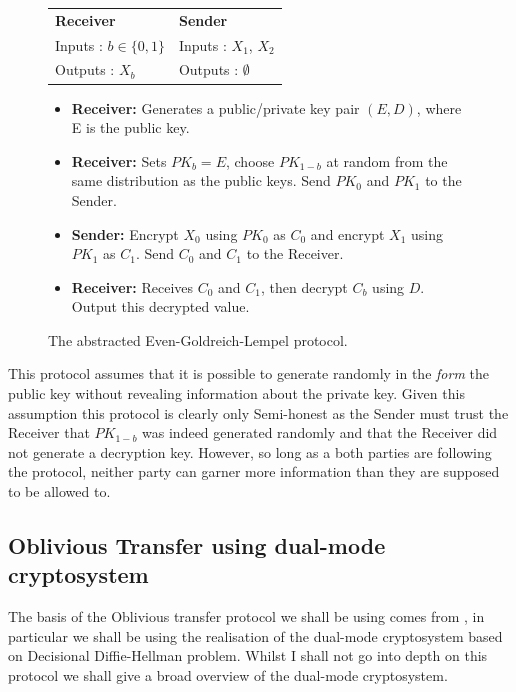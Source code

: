 \documentclass[a4paper,10pt]{article}
\begin{document}
				\begin{figure}
					\begin{tabular}[!htb]{p{6cm} p{6cm}}
						\textbf{Receiver} & \textbf{Sender}\\
						Inputs : $b \in \{0, 1\}$ & Inputs : $X_1$, $X_2$\\
						Outputs : $X_b$ & Outputs : $\emptyset$\\
					\end{tabular}

					\begin{itemize}
						\setlength{\itemsep}{0.5pt}
						\setlength{\parskip}{0pt}
						\setlength{\parsep}{0pt}

						\item \textbf{Receiver:} Generates a public/private key pair $(E, D)$, where E is the public key.\\
						\item \textbf{Receiver:} Sets $PK_b = E$, choose $PK_{1-b}$ at random from the same distribution as the public keys. Send $PK_0$ and $PK_1$ to the Sender.\\
						\item \textbf{Sender:} Encrypt $X_0$ using $PK_0$ as $C_0$ and encrypt $X_1$ using $PK_1$ as $C_1$. Send $C_0$ and $C_1$ to the Receiver.\\
						\item \textbf{Receiver:} Receives $C_0$ and $C_1$, then decrypt $C_b$ using $D$. Output this decrypted value.
					\end{itemize}

					\caption{The abstracted Even-Goldreich-Lempel protocol.}
				\end{figure}

				This protocol assumes that it is possible to generate randomly in the \emph{form} the public key without revealing information about the private key. Given this assumption this protocol is clearly only Semi-honest as the Sender must trust the Receiver that $PK_{1-b}$ was indeed generated randomly and that the Receiver did not generate a decryption key. However, so long as a both parties are following the protocol, neither party can garner more information than they are supposed to be allowed to.
 
		\subsection{Oblivious Transfer using dual-mode cryptosystem} \label{dualModeCryptoOT}
			The basis of the Oblivious transfer protocol we shall be using comes from \cite{PVW_OT_2008}, in particular we shall be using the realisation of the dual-mode cryptosystem based on Decisional Diffie-Hellman problem. Whilst I shall not go into depth on this protocol we shall give a broad overview of the dual-mode cryptosystem.\\
\end{document}

